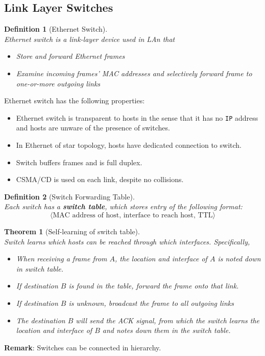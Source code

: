 \documentclass[12pt]{article}
\newcommand\IP{\texttt{IP} }
\newtheorem{definition}{Definition}[section]
\newtheorem{theorem}{Theorem}[section]
\theoremstyle{definition}
\begin{document}
\subsection{Link Layer Switches}
\begin{definition}[Ethernet Switch]
\hfill\\\normalfont Ethernet switch is a link-layer device used in LAn that 
\begin{itemize}
  \item Store and forward Ethernet frames
  \item Examine incoming frames' MAC addresses and selectively forward frame to one-or-more outgoing links
\end{itemize}
\end{definition}
Ethernet switch has the following properties:
\begin{itemize}
\item Ethernet switch is transparent to hosts in the sense that it has no \IP address and hosts are unware of the presence of switches.
\item In Ethernet of star topology, hosts have dedicated connection to switch.
\item Switch buffers frames and is full duplex.
\item CSMA/CD is used on each link, despite no collisions.
\end{itemize}
\begin{definition}[Switch Forwarding Table]
\hfill\\\normalfont Each switch has a \textbf{switch table}, which stores entry of the following format:
\[
\langle\text{MAC address of host, interface to reach host, TTL}\rangle
\]
\end{definition}
\begin{theorem}[Self-learning of switch table]
\hfill\\\normalfont Switch learns which hosts can be reached through which interfaces. Specifically,
\begin{itemize}
  \item When receiving a frame from $A$, the location and interface of $A$ is noted down in switch table.
  \item If destination $B$ is found in the table, forward the frame onto that link.
  \item If destination $B$ is unknown, broadcast the frame to all outgoing links
  \item The destination $B$ will send the ACK signal, from which the switch learns the location and interface of $B$ and notes down them in the switch table.
\end{itemize}
\end{theorem}
\textbf{Remark}: Switches can be connected in hierarchy.
\clearpage
\end{document}
